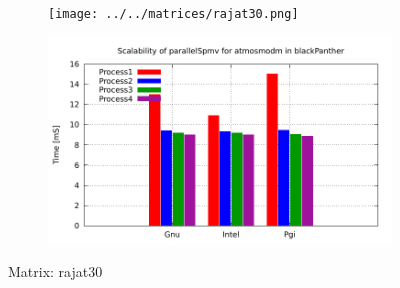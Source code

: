\begin{figure} [ht!]
    \centering
    \captionsetup{justification=centering, singlelinecheck=false}
    \begin{subfigure}{.65\textwidth}
      \centering
      \hspace*{-3.5cm} 
      \texttt{[image: ../../matrices/rajat30.png]}
      \label{fig:rajat30_matrix}
    \end{subfigure}%
    \begin{subfigure}{.65\textwidth}
      \centering
      \hspace*{-6.0cm} 
      \includegraphics[page=5, width=0.95\linewidth]{../plots/blackPanther.pdf}
      \label{fig:rajat30_performance}
    \end{subfigure}
\caption{Matrix: rajat30}
\label{fig:rajat30}
\end{figure}


